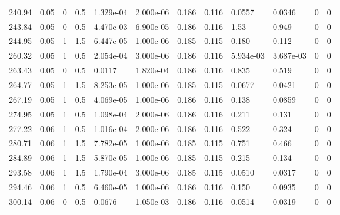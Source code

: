 \documentclass[preview]{standalone}
\begin{document}
{{\begin{tabular}{L{1.2cm}C{1.2cm} C{0.3cm}C{0.5cm} C{1.4cm}C{1.4cm} C{1.4cm}C{1.4cm} C{1.6cm}C{1.6cm} C{1.6cm}C{1.6cm}}
  240.94  &  0.05  & 0     & 0.5 &  1.329e-04  & 2.000e-06  &  0.186&   0.116& 0.0557 & 0.0346   &  0 & 0  \\ 
  243.84  &  0.05  & 0     & 0.5 &  4.470e-03  & 6.900e-05  &  0.186&   0.116& 1.53 & 0.949   &  0 & 0  \\ 
  244.95  &  0.05  & 1     & 1.5 &  6.447e-05  & 1.000e-06  &  0.185&   0.115& 0.180 & 0.112   &  0 & 0  \\ 
  260.32  &  0.05  & 1     & 0.5 &  2.054e-04  & 3.000e-06  &  0.186&   0.116& 5.934e-03 & 3.687e-03   &  0 & 0  \\ 
  263.43  &  0.05  & 0     & 0.5 &  0.0117  & 1.820e-04  &  0.186&   0.116& 0.835 & 0.519   &  0 & 0  \\ 
  264.77  &  0.05  & 1     & 1.5 &  8.253e-05  & 1.000e-06  &  0.185&   0.115& 0.0677 & 0.0421   &  0 & 0  \\ 
  267.19  &  0.05  & 1     & 0.5 &  4.069e-05  & 1.000e-06  &  0.186&   0.116& 0.138 & 0.0859   &  0 & 0  \\ 
  274.95  &  0.05  & 1     & 0.5 &  1.098e-04  & 2.000e-06  &  0.186&   0.116& 0.211 & 0.131   &  0 & 0  \\ 
  277.22  &  0.06  & 1     & 0.5 &  1.016e-04  & 2.000e-06  &  0.186&   0.116& 0.522 & 0.324   &  0 & 0  \\ 
  280.71  &  0.06  & 1     & 1.5 &  7.782e-05  & 1.000e-06  &  0.185&   0.115& 0.751 & 0.466   &  0 & 0  \\ 
  284.89  &  0.06  & 1     & 1.5 &  5.870e-05  & 1.000e-06  &  0.185&   0.115& 0.215 & 0.134   &  0 & 0  \\ 
  293.58  &  0.06  & 1     & 1.5 &  1.790e-04  & 3.000e-06  &  0.185&   0.115& 0.0510 & 0.0317   &  0 & 0  \\ 
  294.46  &  0.06  & 1     & 0.5 &  6.460e-05  & 1.000e-06  &  0.186&   0.116& 0.150 & 0.0935   &  0 & 0  \\ 
  300.14  &  0.06  & 0     & 0.5 &  0.0676  & 1.050e-03  &  0.186&   0.116& 0.0514 & 0.0319   &  0 & 0  \\ 
\hline 
\end{tabular} 

}}
\end{document}
